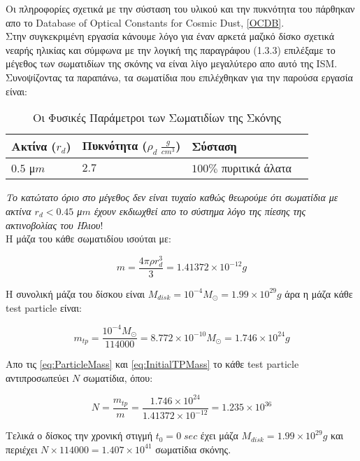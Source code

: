 Οι πληροφορίες σχετικά με την σύσταση του υλικού και την πυκνότητα του πάρθηκαν απο το {\en Database of Optical Constants for Cosmic Dust}, \href{https://www.astro.uni-jena.de/Laboratory/OCDB/index.html}{[{\en OCDB}]}.\\

Στην συγκεκριμένη εργασία κάνουμε λόγο για έναν αρκετά μαζικό δίσκο σχετικά νεαρής ηλικίας και σύμφωνα με την λογική της παραγράφου (1.3.3) επιλέξαμε το μέγεθος των σωματιδίων της σκόνης να είναι λίγο μεγαλύτερο απο αυτό της {\en ISM}. Συνοψίζοντας τα παραπάνω, τα σωματίδια  που επιλέχθηκαν για την παρούσα εργασία είναι:

\begin{table}[h] 
 \centering
 \begin{tabular}{l | l | l | l}
      Ακτίνα ($r_d$) & Πυκνότητα ($\rho_d \; \frac{g}{cm^3}$) & Σύσταση\\
      \hline \hline
     $0.5$ μ$m$ & $2.7$ & $100\%$ πυριτικά άλατα\\
 \end{tabular}
 \caption{Οι Φυσικές Παράμετροι των Σωματιδίων της Σκόνης}\label{tab:ParticlesParameters}
\end{table}   

{\it Το κατώτατο όριο στο μέγεθος δεν είναι τυχαίο καθώς θεωρούμε ότι σωματίδια με ακτίνα $r_{d} < 0.45$ μ$m$ έχουν εκδιωχθεί απο το σύστημα λόγο της πίεσης της ακτινοβολίας του Ήλιου}!\cite{ertel2012observing}\\

Η μάζα του κάθε σωματιδίου ισούται με:

\begin{equation}\label{eq:ParticleMass}
 m=\frac{4 \pi \rho r_d^3 }{3} = 1.41372\times10^{-12} g
\end{equation}

Η συνολική μάζα του δίσκου είναι $M_{disk}= 10^{-4} M_{\odot}=1.99\times10^{29} g$ άρα η μάζα κάθε {\en test particle} είναι:

\begin{equation}\label{eq:InitialTPMass}
 m_{tp}=\frac{10^{-4} M_{\odot}}{114000} = 8.772\times10^{-10} M_{\odot} = 1.746\times10^{24}g
\end{equation}

Απο τις \eqref{eq:ParticleMass} και \eqref{eq:InitialTPMass} το κάθε {\en test particle} αντιπροσωπεύει $N$ σωματίδια, όπου:

\begin{equation}\label{eq:NbParticles}
 N=\frac{m_{tp}}{m}=\frac{1.746\times10^{24}}{1.41372\times10^{-12}} = 1.235\times10^{36}
\end{equation}

Τελικά ο δίσκος την χρονική στιγμή {\en $t_0=0 \; sec$} έχει μάζα $Μ_{disk}=1.99\times10^{29} g$ και περιέχει $N\times114000 = 1.407\times10^{41}$ σωματίδια σκόνης.\\






 